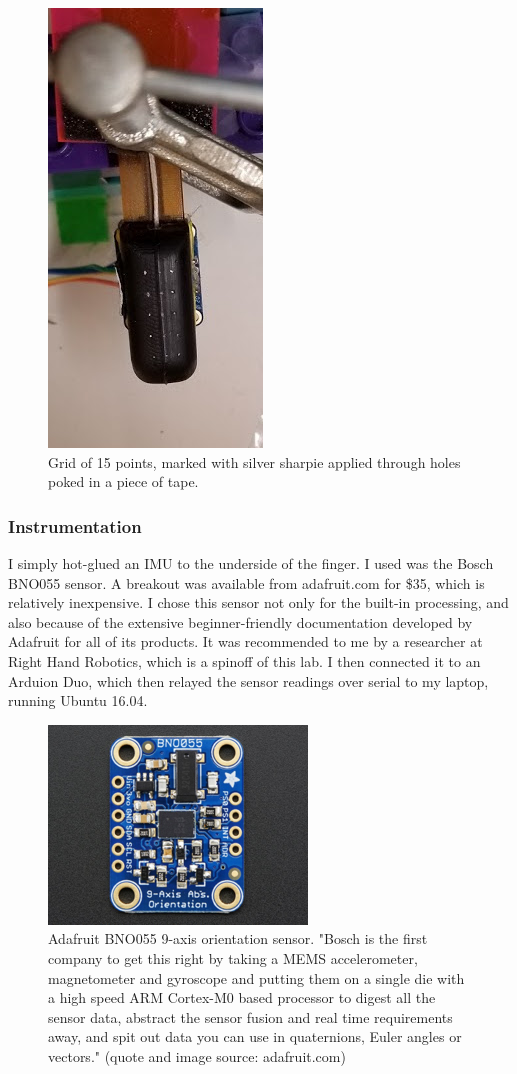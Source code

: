 \documentclass[preprint,12pt,3p]{elsarticle}
\begin{document}
\begin{figure}[H]
\centering
\includegraphics[width=.15\textheight]{images/setup/grid2.jpg}
\caption{Grid of 15 points, marked with silver sharpie applied through holes
poked in a piece of tape.}
\end{figure}

\subsubsection{Instrumentation}
I simply hot-glued an IMU to the underside of the finger. I used was the Bosch BNO055 sensor. A breakout
was available from adafruit.com for \$35, which is relatively inexpensive. I chose this sensor not
only for the built-in processing, and also because of the extensive beginner-friendly documentation
developed by Adafruit for all of its products. It was recommended to me by a
researcher at  
Right Hand Robotics, which is a spinoff of this lab. I then connected it to an
Arduion Duo, which then relayed the sensor readings over serial to my laptop,
running Ubuntu 16.04.

\begin{figure}[H]
\centering
\includegraphics[width=.3\textwidth]{images/setup/bno055.png}
\caption{Adafruit BNO055 9-axis orientation sensor. "Bosch is the first company to get this right by taking a MEMS
    accelerometer, magnetometer and gyroscope and putting them on a single die
    with a high speed ARM Cortex-M0 based processor to digest all the sensor
    data, abstract the sensor fusion and real time requirements away, and spit
    out data you can use in quaternions, Euler angles or vectors." (quote and
    image source: adafruit.com)}
\end{figure}
\end{document}
